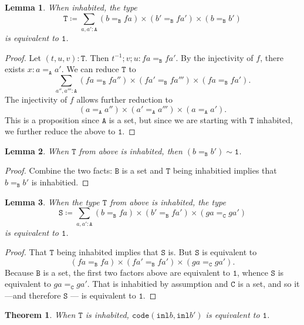 \message{ !name(notes.tex)}\documentclass[12pt]{amsart}
\newcommand{\type}[1]{\mathtt{#1}}
\newcommand{\tin}{\colon}
\newcommand{\A}{\type{A}}
\newcommand{\B}{\type{B}}
\newcommand{\C}{\type{C}}
\newcommand{\inl}{\type{inl}}
\newcommand{\code}{\type{code}}
\newtheorem{lemma}{Lemma}
\newtheorem{thm}{Theorem}
\theoremstyle{remark}
\theoremstyle{definition}
\begin{document}
\begin{lemma}
  When inhabited, the type
  \[
    \type{T} \coloneqq \sum_{a,a' \tin \A} ( b =_{\B} fa ) \times ( b' =_{\B} fa' )
    \times ( b =_{\B} b' )
  \]
  is equivalent to \( \type{1} \). 
\end{lemma}

\begin{proof}
  Let \( (t,u,v) \tin \type{T} \).  Then \( t^{-1} ; v ; u \tin
  fa =_{\B} fa' \). By the injectivity of \( f \), there exists \( x
  \tin a =_{\A} a' \). We can reduce \( \type{T} \) to
  \[
    \sum_{a'',a''' \tin \A} ( fa =_{\B} fa'' ) \times ( fa' =_{\B} fa''' ) \times ( fa =_{\B} fa' ).
  \]
  The injectivity of \( f \) allows further reduction to
  \[
    ( a =_{\A} a'' ) \times ( a' =_{\A} a''' ) \times ( a =_{\A} a' ).
  \]
  This is a proposition since \( \A \) is a set, but since we are
  starting with \( \type{T} \) inhabited, we further reduce the above
  to \( \type{1} \).
\end{proof}

\begin{lemma}
  When \( \type{T} \) from above is inhabited, then \( ( b =_{\B} b' ) \sim \type{1} \). 
\end{lemma}

\begin{proof}
  Combine the two facts: \( \B \) is a set and \( \type{T} \) being
  inhabitied implies that \( b =_{\B} b' \) is inhabitied.
\end{proof}

\begin{lemma}
  When the type \( \type{T} \) from above is inhabited, the type
  \[
    \type{S} \coloneqq \sum_{a,a' \tin \A} ( b =_{\B} fa ) \times ( b' =_{\B} fa' )
    \times ( ga =_{\C} ga' )
  \]
  is equivalent to \( \type{1} \). 
\end{lemma}

\begin{proof}
  That \( \type{T} \) being inhabited implies that \( \type{S} \) is.
  But \( \type{S} \) is equivalent to
  \[
    ( fa =_{\B} fa ) \times ( fa' =_{\B} fa' ) \times ( ga =_{\C} ga' ).
  \]
  Because \( \B \) is a set, the first two factors above are
  equivalent to \( \type{1} \), whence \( \type{S} \) is equivalent to
  \( ga =_{\C} ga' \). That is inhabitied by assumption and \( \C \)
  is a set, and so it---and therefore \( \type{S} \) --- is equivalent
  to \( \type{1} \). 
\end{proof}

\begin{thm}
  When \( \type{T} \) is inhabited, \( \code ( \inl b , \inl b' ) \)
  is equivalent to \( \type{1} \).
\end{thm}
\end{document}
